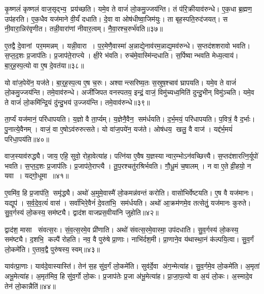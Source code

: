 कृ॒ष्णलं॑ कृष्णलं वाज॒सृद्भ्य॒ प्रय॑च्छति।
यमे॒व ते वाजं॑ लो॒कमु॒ज्जय॑न्ति।
तं प॑रि॒क्रीयाव॑रुन्धे।
ए॒क॒धा ब्र॒ह्मण॒ उप॑हरति।
ए॒क॒धैव यज॑माने वी॒र्यं॑ दधाति।
दे॒वा वा ओष॑धीष्वा॒जिम॑युः।
ता बृह॒स्पति॒रुद॑जयत्।
स नी॒वारा॒न्निर॑वृणीत।
तन्नी॒वारा॑णां नीवार॒त्वम्।
नै॒वा॒रश्च॒रुर्भ॑वति॥३७॥

ए॒तद्वै दे॒वानां पर॒ममन्नम्।
यन्नी॒वारा।
प॒र॒मेणै॒वास्मा॑ अ॒न्नाद्ये॒नाव॑रम॒न्नाद्य॒मव॑रुन्धे।
स॒प्तद॑शशरावो भवति।
स॒प्त॒द॒शः प्र॒जाप॑तिः।
प्र॒जाप॑ते॒राप्त्ये।
क्षी॒रे भ॑वति।
रुच॑मे॒वास्मि॑न्दधाति।
स॒र्पिष्वान्भवति मेध्य॒त्वाय॑।
बा॒र्॒ह॒स्प॒त्यो वा ए॒ष दे॒वत॑या॥३८॥

यो वा॑ज॒पेये॑न॒ यज॑ते।
बा॒र्॒ह॒स्प॒त्य ए॒ष च॒रुः।
अश्वान्त्सरिष्य॒तः स॒स्रुष॒श्चाव॑ घ्रापयति।
यमे॒व ते वाजं॑ लो॒कमु॒ज्जय॑न्ति।
तमे॒वाव॑रुन्धे।
अजी॑जिपत वनस्पतय॒ इन्द्रं॒ वाजं॒ विमु॑च्यध्व॒मिति॑ दुन्दु॒भीन् विमु॑ञ्चति।
यमे॒व ते वाजं॑ लो॒कमि॑न्द्रि॒यं दु॑न्दु॒भय॑ उ॒ज्जय॑न्ति।
तमे॒वाव॑रुन्धे॥३९॥

ता॒र्प्यं यज॑मानं॒ परि॑धापयति।
य॒ज्ञो वै ता॒र्प्यम्।
य॒ज्ञेनै॒वैन॒ सम॑र्धयति।
द॒र्भ॒मयं॒ परि॑धापयति।
प॒वित्रं॒ वै द॒र्भाः।
पु॒नात्ये॒वैनम्।
वाजं॒ वा ए॒षोऽव॑रुरुत्सते।
यो वा॑ज॒पये॑न॒ यज॑ते।
ओष॑धय॒ खलु॒ वै वाज॑।
यद्द॑र्भ॒मयं॑ परिधा॒पय॑ति॥४०॥

वाज॒स्याव॑रुद्ध्यै।
जाय॒ एहि॒ सुवो॒ रोहा॒वेत्या॑ह।
पत्नि॑या ए॒वैष य॒ज्ञस्यान्वार॒म्भोऽन॑वच्छित्त्यै।
स॒प्तद॑शारत्नि॒र्यूपो॑ भवति।
स॒प्त॒द॒शः प्र॒जाप॑तिः।
प्र॒जाप॑ते॒राप्त्यै।
तू॒प॒रश्चतु॑रश्रिर्भवति।
गौ॒धू॒मं च॒षालम्।
न वा ए॒ते व्री॒हयो॒ न यवा।
यद्गो॒धूमा॥४१॥

ए॒वमि॑व॒ हि प्र॒जाप॑ति॒ समृ॑द्ध्यै।
अथो॑ अ॒मुमे॒वास्मै॑ लो॒कमन्न॑वन्तं करोति।
वासो॑भिर्वेष्टयति।
ए॒ष वै यज॑मानः।
यद्यूप॑।
स॒र्व॒दे॒व॒त्यं॑ वास॑।
सर्वा॑भिरे॒वैनं॑ दे॒वता॑भि॒ सम॑र्धयति।
अथो॑ आ॒क्रम॑णमे॒व तत्सेतुं॒ यज॑मानः कुरुते।
सु॒व॒र्गस्य॑ लो॒कस्य॒ सम॑ष्ट्यै।
द्वाद॑श वाजप्रस॒वीया॑नि जुहोति॥४२॥

द्वाद॑श॒ मासा संवत्स॒रः।
सं॒व॒त्स॒रमे॒व प्री॑णाति।
अथो॑ संवत्स॒रमे॒वास्मा॒ उप॑दधाति।
सु॒व॒र्गस्य॑ लो॒कस्य॒ सम॑ष्ट्यै।
द॒शभि॒ कल्पै॑ रोहति।
नव॒ वै पुरु॑षे प्रा॒णाः।
नाभि॑र्दश॒मी।
प्रा॒णाने॒व य॑थास्था॒नं क॑ल्पयि॒त्वा।
सु॒व॒र्गं लो॒कमे॑ति।
ए॒ताव॒द्वै पुरु॑षस्य॒ स्वम्॥४३॥

याव॑त्प्रा॒णाः।
याव॑दे॒वास्यास्ति॑।
तेन॑ स॒ह सु॑व॒र्गं लो॒कमे॑ति।
सुव॑र्दे॒वा अ॑ग॒न्मेत्या॑ह।
सु॒व॒र्गमे॒व लो॒कमे॑ति।
अ॒मृता॑ अभू॒मेत्या॑ह।
अ॒मृत॑मिव॒ हि सु॑व॒र्गो लो॒कः।
प्र॒जाप॑तेः प्र॒जा अ॑भू॒मेत्या॑ह।
प्रा॒जा॒प॒त्यो वा अ॒यं लो॒कः।
अ॒स्मादे॒व तेन॑ लो॒कान्नैति॑॥४४॥

